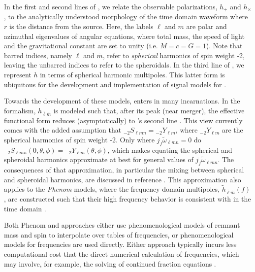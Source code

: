 \documentclass[twocolumn,aps,prd,floatfix,preprintnumbers,a4paper,nofootinbib,
superscriptaddress,10pt]{revtex4-1}
\newcommand{\cw}{\tilde{\omega}}
\def\jf{j_f}
\def\lmn{_{\ell m n}}
\def\LM{_{\bar{\ell} \bar{m}}}
\begin{document}
%
\par In the first and second lines of , we relate the observable \gw{} polarizations, $h_+$ and $h_\times$, to the analytically understood morphology of the time domain \rd{} waveform where $r$ is the distance from the source.
%
Here, the labels $\ell$ and $m$ are polar and azimuthal eigenvalues of  angular equations, where total mass, the speed of light and the gravitational constant are set to unity (i.e. $M=c=G=1$).
%
Note that barred indices, namely $\bar{\ell}$ and $\bar{m}$, refer to \textit{spherical} harmonics of spin weight -2, leaving the unbarred indices to refer to the spheroidals.
%
In the third line of , we represent $h$ in terms of {spherical} harmonic multipoles.
%
This latter form is ubiquitous for the development and implementation of \imr{} signal models for .
%
%
\par Towards the development of these models,  enters in many incarnations.
%
In the \eob{} formalism, $h\LM$ is modeled such that, after its peak (near merger), the effective functional form reduces (asymptotically) to 's second line \cite{Cotesta:2018fcv, Buonanno:2000ef,
Bohe:2016gbl,Pan:2013rra, Bohe:2016gbl, Nagar:2018zoe,Babak:2016tgq}.
%
This view currently comes with the added assumption that ${_{-2}}S_{\ell m n} = {_{-2}}Y_{\ell m}$, where ${_{-2}}Y_{\ell m}$ are the spherical harmonics of spin weight -2.
%
Only where $\jf \cw\lmn=0$ do $_{-2}S\lmn( 0,\theta,\phi) = {_{-2}}Y_{\ell m}(\theta,\phi)$, which makes equating the spherical and spheroidal harmonics approximate at best for general values of $\jf \cw\lmn$.
%
The consequences of that approximation, in particular the mixing between spherical and spheroidal harmonics, are discussed in reference \cite{London:2014cma,Berti:2014fga,London:2018gaq,Kelly:2012nd}.
%
This approximation also applies to the \textit{Phenom} models,
where the frequency domain multipoles, $\tilde{h}\LM(f)$, are constructed such that their high frequency behavior is consistent with  in the time domain
%
\cite{Hannam:2013oca, London:2017bcn, Khan:2015jqa, Schmidt:2014iyl, Mehta:2017jpq,Khan:2018fmp}.
%
\par Both Phenom and \eob{} approaches either use phenomenological models of remnant \bh{} mass and spin to interpolate over tables of \qnm{} frequencies, or phenomenological models for \qnm{} frequencies are used directly.
%
Either approach typically incurs less computational cost that the direct numerical calculation of \qnm{} frequencies, which may involve, for example, the solving of continued fraction equations \cite{Leaver85}.
\end{document}
